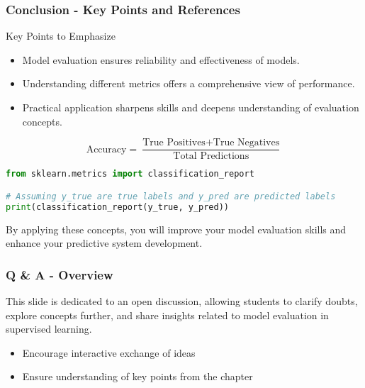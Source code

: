 \documentclass[aspectratio=169]{beamer}
\begin{document}
\begin{frame}[fragile]
    \frametitle{Conclusion - Key Points and References}
    \begin{block}{Key Points to Emphasize}
        \begin{itemize}
            \item Model evaluation ensures reliability and effectiveness of models.
            \item Understanding different metrics offers a comprehensive view of performance.
            \item Practical application sharpens skills and deepens understanding of evaluation concepts.
        \end{itemize}
    \end{block}

    \begin{equation}
        \text{Accuracy} = \frac{\text{True Positives} + \text{True Negatives}}{\text{Total Predictions}}
    \end{equation}

    \begin{lstlisting}[language=Python, basicstyle=\footnotesize]
from sklearn.metrics import classification_report

# Assuming y_true are true labels and y_pred are predicted labels
print(classification_report(y_true, y_pred))
    \end{lstlisting}
    
    By applying these concepts, you will improve your model evaluation skills and enhance your predictive system development.
\end{frame}

\begin{frame}[fragile]
    \frametitle{Q \& A - Overview}
    This slide is dedicated to an open discussion, allowing students to clarify doubts, explore concepts further, and share insights related to model evaluation in supervised learning.
    \begin{itemize}
        \item Encourage interactive exchange of ideas
        \item Ensure understanding of key points from the chapter
    \end{itemize}
\end{frame}
\end{document}
